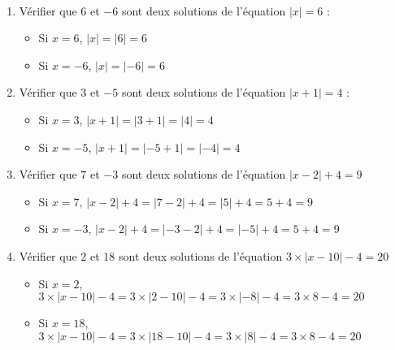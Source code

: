 \documentclass[
	classe=$2^{de}$,
	headerTitle=Chapitre\space 1
]{exercice}
\begin{document}
\begin{exercice}\
	\begin{enumerate}
		\item Vérifier que $6$ et $-6$ sont deux solutions de l'équation $|x| = 6$ :
		      \ifdefined\makeCorrection
			      {\color{red}\begin{itemize}
					      \item Si $x = 6$, $|x| = |6| = 6$
					      \item Si $x = -6$, $|x| = |{-}6| = 6$
				      \end{itemize}}
		      \else
			      \vspace{3em}
		      \fi
		\item Vérifier que $3$ et $-5$ sont deux solutions de l'équation $|x + 1| = 4$ :
		      \ifdefined\makeCorrection
			      {\color{red}\begin{itemize}
					      \item Si $x = 3$, $|x + 1| = |3 + 1| = |4| = 4$
					      \item Si $x = {-}5$, $|x + 1| = |{-}5 + 1| = |{-}4| = 4$
				      \end{itemize}}
		      \else
			      \vspace{3em}
		      \fi
		\item Vérifier que $7$ et $-3$ sont deux solutions de l'équation $|x - 2| + 4 = 9$
		      \ifdefined\makeCorrection
			      {\color{red}\begin{itemize}
					      \item Si $x = 7$, $|x - 2| + 4 = |7 - 2| + 4 = |5| + 4 = 5 + 4 = 9$
					      \item Si $x = {-}3$, $|x - 2| + 4 = |{-}3 - 2| + 4 = |{-}5| + 4 = 5 + 4 = 9$
				      \end{itemize}}
		      \else
			      \vspace{3em}
		      \fi
		\item Vérifier que $2$ et $18$ sont deux solutions de l'équation $3 × |x - 10| - 4 = 20$
		      \ifdefined\makeCorrection
			      {\color{red}\begin{itemize}
					      \item Si $x = 2$, $3 × |x - 10| - 4 = 3 × |2 - 10| - 4 = 3 × |{-}8| - 4 = 3 × 8 - 4 = 20$
					      \item Si $x = 18$, $3 × |x - 10| - 4 = 3 × |18 - 10| - 4 = 3 × |8| - 4 = 3 × 8 - 4 = 20$
				      \end{itemize}}
		      \else
			      \vspace{3em}
		      \fi
	\end{enumerate}
\end{exercice}
\end{document}
